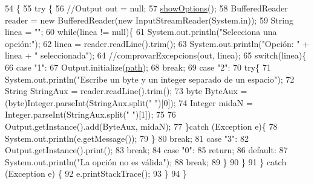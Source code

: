 \begin{DoxyCode}
54                                            \{
55         \textcolor{keywordflow}{try} \{
56             \textcolor{comment}{//Output out = null;}
57             \hyperlink{classpersistencia_1_1output_1_1Driver____Output_a73ae13b88bf305d442012408333aae35}{showOptions}();
58             BufferedReader reader = \textcolor{keyword}{new} BufferedReader(\textcolor{keyword}{new} InputStreamReader(System.in));
59             String linea = \textcolor{stringliteral}{""};
60             \textcolor{keywordflow}{while}(linea != null)\{
61                 System.out.println(\textcolor{stringliteral}{"Selecciona una opción:"});
62                 linea = reader.readLine().trim();
63                 System.out.println(\textcolor{stringliteral}{"Opción: "} + linea + \textcolor{stringliteral}{" seleccionada"});
64                 \textcolor{comment}{//comprovarExcepcions(out, linea);}
65                 \textcolor{keywordflow}{switch}(linea)\{
66                     \textcolor{keywordflow}{case} \textcolor{stringliteral}{"1"}:
67                         Output.initialize(\hyperlink{classpersistencia_1_1output_1_1Driver____Output_a1701bae356c7bf388a5466895c22ff64}{path});
68                     \textcolor{keywordflow}{break};
69                     \textcolor{keywordflow}{case} \textcolor{stringliteral}{"2"}:
70                     \textcolor{keywordflow}{try}\{
71                         System.out.println(\textcolor{stringliteral}{"Escribe un byte y un integer separado de un espacio"});
72                         String StringAux = reader.readLine().trim();
73                         byte ByteAux = (byte)Integer.parseInt(StringAux.split(\textcolor{stringliteral}{" "})[0]);
74                         Integer midaN = Integer.parseInt(StringAux.split(\textcolor{stringliteral}{" "})[1]);
75                         
76                         Output.getInstance().add(ByteAux, midaN);
77                     \}\textcolor{keywordflow}{catch} (Exception e)\{
78                         System.out.println(e.getMessage());
79                     \}
80                     \textcolor{keywordflow}{break};
81                     \textcolor{keywordflow}{case} \textcolor{stringliteral}{"3"}:
82                         Output.getInstance().print();
83                     \textcolor{keywordflow}{break};
84                     \textcolor{keywordflow}{case} \textcolor{stringliteral}{"0"}:
85                         \textcolor{keywordflow}{return};
86                     \textcolor{keywordflow}{default}:
87                         System.out.println(\textcolor{stringliteral}{"La opción no es válida"});
88                     \textcolor{keywordflow}{break};
89                 \}
90             \}
91         \} \textcolor{keywordflow}{catch} (Exception e) \{
92             e.printStackTrace();
93         \}
94     \}
\end{DoxyCode}
